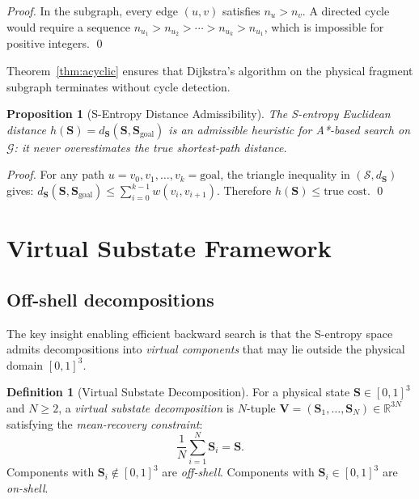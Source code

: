 \documentclass[twocolumn,10pt,a4paper]{article}
\theoremstyle{thmstyle}
\newtheorem{proposition}[theorem]{Proposition}
\theoremstyle{definition}
\newtheorem{definition}[theorem]{Definition}
\theoremstyle{remark}
\newcommand{\R}{\mathbb{R}}
\newcommand{\Sv}{\mathbf{S}}
\newcommand{\calS}{\mathcal{S}}
\newcommand{\calG}{\mathcal{G}}
\begin{document}
\begin{proof}
In the subgraph, every edge $(u,v)$ satisfies $n_u > n_v$. A directed
cycle would require a sequence $n_{u_1} > n_{u_2} > \cdots > n_{u_k} >
n_{u_1}$, which is impossible for positive integers. \qed
\end{proof}

Theorem~\ref{thm:acyclic} ensures that Dijkstra's algorithm on the
physical fragment subgraph terminates without cycle detection.

\begin{proposition}[S-Entropy Distance Admissibility]
\label{prop:admissible-heuristic}
The S-entropy Euclidean distance $h(\Sv) = d_{\Sv}(\Sv, \Sv_\text{goal})$
is an admissible heuristic for A*-based search on $\calG$: it never
overestimates the true shortest-path distance.
\end{proposition}

\begin{proof}
For any path $u = v_0, v_1, \ldots, v_k = \text{goal}$, the triangle
inequality in $(\calS, d_{\Sv})$ gives:
$d_{\Sv}(\Sv, \Sv_\text{goal}) \leq \sum_{i=0}^{k-1} w(v_i, v_{i+1})$.
Therefore $h(\Sv) \leq \text{true cost}$. \qed
\end{proof}

\section{Virtual Substate Framework}
\label{sec:virtual}

\subsection{Off-shell decompositions}

The key insight enabling efficient backward search is that the S-entropy
space admits decompositions into \emph{virtual components} that may lie
outside the physical domain $[0,1]^3$.

\begin{definition}[Virtual Substate Decomposition]
\label{def:virtual}
For a physical state $\Sv \in [0,1]^3$ and $N \geq 2$, a
\emph{virtual substate decomposition} is $N$-tuple
$\mathbf{V} = (\Sv_1, \ldots, \Sv_N) \in \R^{3N}$ satisfying the
\emph{mean-recovery constraint}:
\begin{equation}
\frac{1}{N}\sum_{i=1}^{N}\Sv_i = \Sv.
\label{eq:mean-recovery}
\end{equation}
Components with $\Sv_i \notin [0,1]^3$ are \emph{off-shell}.
Components with $\Sv_i \in [0,1]^3$ are \emph{on-shell}.
\end{definition}
\end{document}
